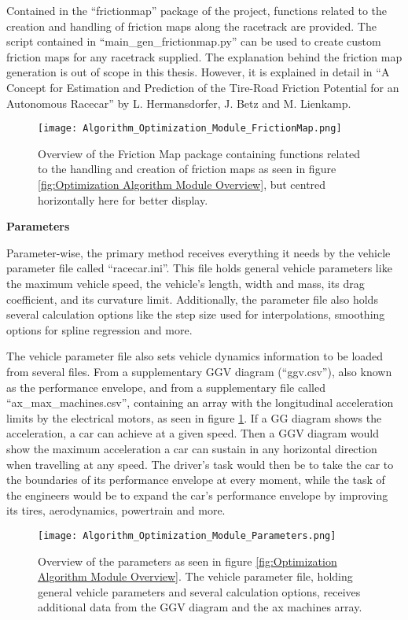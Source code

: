 Contained in the ``frictionmap'' package of the project, functions related to the creation and handling of friction maps along the racetrack are provided.
The script contained in ``main\_gen\_frictionmap.py'' can be used to create custom friction maps for any racetrack supplied. The explanation behind the friction map generation is out of scope in this thesis. However, it is explained in detail in ``A Concept for Estimation and Prediction of the Tire-Road Friction Potential for an Autonomous Racecar'' by L. Hermansdorfer, J. Betz and M. Lienkamp. \cite{friction_map_generation}
\begin{figure}[H]
    \centering
    \texttt{[image: Algorithm\_Optimization\_Module\_FrictionMap.png]}
    \caption{Overview of the Friction Map package containing functions related to the handling and creation of friction maps as seen in figure \ref{fig:Optimization Algorithm Module Overview}, but centred horizontally here for better display.}
\end{figure}

\textbf{Parameters}

Parameter-wise, the primary method receives everything it needs by the vehicle parameter file called ``racecar.ini''. This file holds general vehicle parameters like the maximum vehicle speed, the vehicle's length, width and mass, its drag coefficient, and its curvature limit. Additionally, the parameter file also holds several calculation options like the step size used for interpolations, smoothing options for spline regression and more.

The vehicle parameter file also sets vehicle dynamics information to be loaded from several files. From a supplementary GGV diagram (``ggv.csv''), also known as the performance envelope, and from a supplementary file called ``ax\_max\_machines.csv'', containing an array with the longitudinal acceleration limits by the electrical motors, as seen in figure \ref{fig:Optimization Algorithm Module Parameters}. If a GG diagram shows the acceleration, a car can achieve at a given speed. Then a GGV diagram would show the maximum acceleration a car can sustain in any horizontal direction when travelling at any speed. The driver's task would then be to take the car to the boundaries of its performance envelope at every moment, while the task of the engineers would be to expand the car's performance envelope by improving its tires, aerodynamics, powertrain and more. \cite{the_performance_envelope_or_ggv_diagram}
\begin{figure}[H]
    \centering
    \texttt{[image: Algorithm\_Optimization\_Module\_Parameters.png]}
    \caption{Overview of the parameters as seen in figure \ref{fig:Optimization Algorithm Module Overview}. The vehicle parameter file, holding general vehicle parameters and several calculation options, receives additional data from the GGV diagram and the ax machines array.}
    \label{fig:Optimization Algorithm Module Parameters}
\end{figure}

